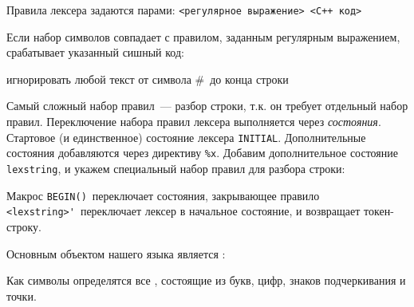 Правила лексера задаются парами: \verb|<регулярное выражение> <C++ код>|

Если набор символов совпадает с правилом, заданным регулярным выражением,
срабатывает указанный сишный код:


игнорировать любой текст от символа \#\ до конца строки

Самый сложный набор правил\ --- разбор строки, т.к. он требует отдельный
набор правил. Переключение набора правил лексера выполняется через
\emph{состояния}. Стартовое (и единственное) состояние лексера \verb|INITIAL|.
Дополнительные состояния добавляются через директиву \verb|%x|. Добавим 
дополнительное состояние \verb|lexstring|, и укажем специальный набор правил
для разбора строки:


Макрос \verb|BEGIN()|\ переключает состояния, закрывающее правило
\verb|<lexstring>'|\ переключает лексер в начальное состояние, и возвращает
токен-строку.

Основным объектом нашего языка является :


Как символы определятся все , состоящие из букв,
цифр, знаков подчеркивания и точки.



\secup

\clearpage
{}
\printindex

